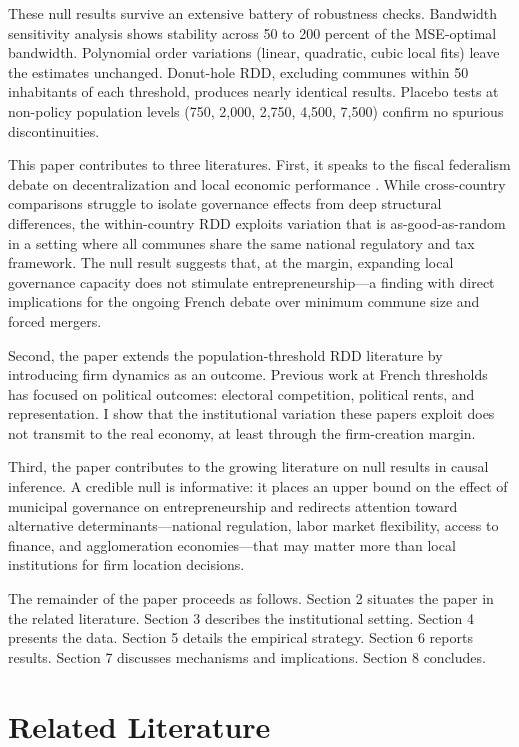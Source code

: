 \documentclass[12pt]{article}
\begin{document}
These null results survive an extensive battery of robustness checks. Bandwidth sensitivity analysis shows stability across 50 to 200 percent of the MSE-optimal bandwidth. Polynomial order variations (linear, quadratic, cubic local fits) leave the estimates unchanged. Donut-hole RDD, excluding communes within 50 inhabitants of each threshold, produces nearly identical results. Placebo tests at non-policy population levels (750, 2,000, 2,750, 4,500, 7,500) confirm no spurious discontinuities.

This paper contributes to three literatures. First, it speaks to the fiscal federalism debate on decentralization and local economic performance \citep{bardhan2002, oates1972}. While cross-country comparisons struggle to isolate governance effects from deep structural differences, the within-country RDD exploits variation that is as-good-as-random in a setting where all communes share the same national regulatory and tax framework. The null result suggests that, at the margin, expanding local governance capacity does not stimulate entrepreneurship---a finding with direct implications for the ongoing French debate over minimum commune size and forced mergers.

Second, the paper extends the population-threshold RDD literature \citep{eggers2018, lopes2017, pettersson2008} by introducing firm dynamics as an outcome. Previous work at French thresholds has focused on political outcomes: electoral competition, political rents, and representation. I show that the institutional variation these papers exploit does not transmit to the real economy, at least through the firm-creation margin.

Third, the paper contributes to the growing literature on null results in causal inference. A credible null is informative: it places an upper bound on the effect of municipal governance on entrepreneurship and redirects attention toward alternative determinants---national regulation, labor market flexibility, access to finance, and agglomeration economies---that may matter more than local institutions for firm location decisions.

The remainder of the paper proceeds as follows. Section 2 situates the paper in the related literature. Section 3 describes the institutional setting. Section 4 presents the data. Section 5 details the empirical strategy. Section 6 reports results. Section 7 discusses mechanisms and implications. Section 8 concludes.

\section{Related Literature}
\end{document}
